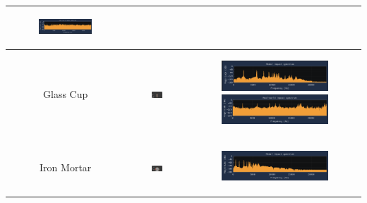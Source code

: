 \documentclass[12pt]{article}
\begin{document}
\begin{table}[!ht]
\begin{tabular}{|c|c|c|}
\begin{subfigure}{0.3\linewidth}
    \includegraphics[width=\linewidth]{images/impacts/CeramicPitcherReal.png}
  \end{subfigure} \\ \hline
  Glass Cup & \includegraphics[width=0.2\textwidth]{images/impacts/GlassCupMesh.png} & 
  \begin{subfigure}{0.3\linewidth}
    \includegraphics[width=\linewidth]{images/impacts/GlassCupModal.png}
    \includegraphics[width=\linewidth]{images/impacts/GlassCupReal.png}
  \end{subfigure} \\ \hline
  Iron Mortar & \includegraphics[width=0.2\textwidth]{images/impacts/IronMortarMesh.png} & 
  \begin{subfigure}{0.3\linewidth}
    \includegraphics[width=\linewidth]{images/impacts/IronMortarModal.png}

\end{subfigure}
\end{tabular}
\end{table}
\end{document}
